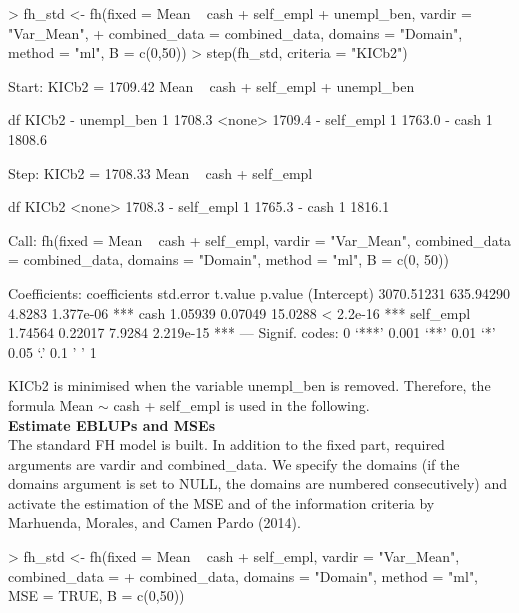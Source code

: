\begin{example}
\textgreater{} fh\_std \textless- fh(fixed = Mean ~ cash + self\_empl + unempl\_ben, vardir =
"Var\_Mean", + combined\_data = combined\_data, domains = "Domain",
method = "ml", B = c(0,50)) \textgreater{} step(fh\_std, criteria = "KICb2")

Start: KICb2 = 1709.42 Mean ~ cash + self\_empl + unempl\_ben

df KICb2 - unempl\_ben 1 1708.3 \textless none\textgreater{} 1709.4 - self\_empl 1 1763.0 -
cash 1 1808.6

Step: KICb2 = 1708.33 Mean ~ cash + self\_empl

df KICb2 \textless none\textgreater{} 1708.3 - self\_empl 1 1765.3 - cash 1 1816.1

Call: fh(fixed = Mean ~ cash + self\_empl, vardir = "Var\_Mean",
combined\_data = combined\_data, domains = "Domain", method = "ml", B
= c(0, 50))

Coefficients: coefficients std.error t.value p.value (Intercept)
3070.51231 635.94290 4.8283 1.377e-06 *** cash 1.05939 0.07049
15.0288 \textless{} 2.2e-16 *** self\_empl 1.74564 0.22017 7.9284 2.219e-15
*** --- Signif. codes: 0 `***' 0.001 `**' 0.01 `*' 0.05 `.' 0.1
' ' 1
\end{example}

KICb2 is minimised when the variable unempl\_ben is removed. Therefore,
the formula Mean \(\sim\) cash + self\_empl is used in the following.\\
\textbf{Estimate EBLUPs and MSEs}\\
The standard FH model is built. In addition to the fixed part, required
arguments are vardir and combined\_data. We specify the domains (if the
domains argument is set to NULL, the domains are numbered consecutively)
and activate the estimation of the MSE and of the information criteria
by Marhuenda, Morales, and Camen Pardo (2014).

\begin{example}
\textgreater{} fh\_std \textless- fh(fixed = Mean ~ cash + self\_empl, vardir = "Var\_Mean",
combined\_data = + combined\_data, domains = "Domain", method = "ml",
MSE = TRUE, B = c(0,50))
\end{example}

